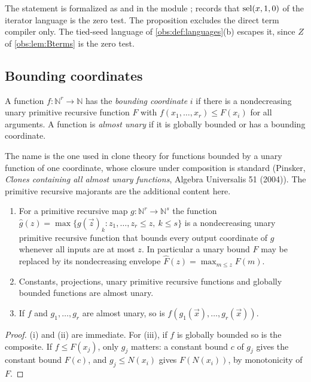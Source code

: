 The statement is formalized as  and 
in the module ;  records that
$\operatorname{sel}(x,1,0)$ of the iterator language is the zero test. The proposition
excludes the direct term compiler only. The tied-seed language of
\cref{obs:def:languages}(b) escapes it, since $Z$ of \cref{obs:lem:Bterms} is
the zero test.

\subsection{Bounding coordinates}

\begin{definition}
\label{obs:def:bc}
A function $f\colon\mathbb{N}^r\to\mathbb{N}$ has the \emph{bounding
coordinate} $i$ if there is a nondecreasing unary primitive recursive function
$F$ with $f(x_1,\dots,x_r)\le F(x_i)$ for all arguments. A function is
\emph{almost unary} if it is globally bounded or has a bounding coordinate.
\end{definition}

The name is the one used in clone theory for functions bounded by a unary
function of one coordinate, whose closure under composition is standard
(Pinsker, \emph{Clones containing all almost unary functions}, Algebra
Universalis 51 (2004)). The primitive recursive majorants are the additional
content here.

\begin{lemma}
\label{obs:lem:envelope}
\begin{enumerate}[label=(\roman*)]
\item For a primitive recursive map $g\colon\mathbb{N}^r\to\mathbb{N}^s$ the
function $\widehat g(z)=\max\{g(\vec z)_k: z_1,\dots,z_r\le z,\ k\le s\}$ is a
nondecreasing unary primitive recursive function that bounds every output
coordinate of $g$ whenever all inputs are at most $z$. In particular a unary
bound $F$ may be replaced by its nondecreasing envelope
$\widehat F(z)=\max_{m\le z}F(m)$.
\item Constants, projections, unary primitive recursive functions and globally
bounded functions are almost unary.
\item If $f$ and $g_1,\dots,g_r$ are almost unary, so is
$f(g_1(\vec x),\dots,g_r(\vec x))$.
\end{enumerate}
\end{lemma}

\begin{proof}
(i) and (ii) are immediate. For (iii), if $f$ is globally bounded so is the
composite. If $f\le F(x_j)$, only $g_j$ matters: a constant bound $c$ of $g_j$
gives the constant bound $F(c)$, and $g_j\le N(x_i)$ gives $F(N(x_i))$, by
monotonicity of $F$.
\end{proof}

